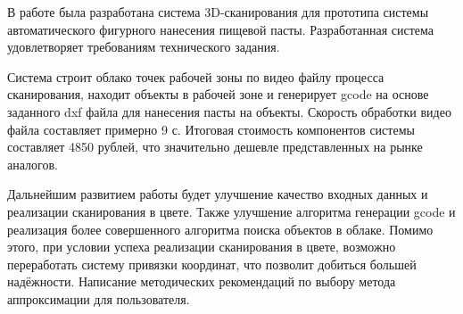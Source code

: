 \conclusion
В работе была разработана система 3D-сканирования для прототипа системы автоматического фигурного нанесения пищевой пасты. Разработанная система удовлетворяет требованиям технического задания.

Система строит облако точек рабочей зоны по видео файлу процесса сканирования, находит объекты в рабочей зоне и генерирует gcode на основе заданного dxf файла для нанесения пасты на объекты. Скорость обработки видео файла составляет примерно 9 с. Итоговая стоимость компонентов системы составляет 4850 рублей, что значительно дешевле представленных на рынке аналогов.

Дальнейшим развитием работы будет улучшение качество входных данных и реализации сканирования в цвете. Также улучшение алгоритма генерации gcode и реализация более совершенного алгоритма поиска объектов в облаке. Помимо этого, при условии успеха реализации сканирования в цвете, возможно переработать систему привязки координат, что позволит добиться большей надёжности. Написание методических рекомендаций по выбору метода аппроксимации для пользователя.